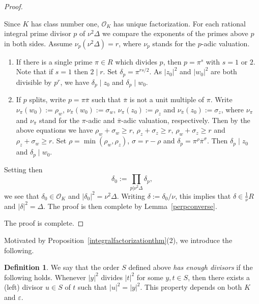 \documentclass[11pt]{amsart}
\theoremstyle{definition}
\newtheorem*{definition}{Definition}
\theoremstyle{remark}
\begin{document}
\begin{proof}
\begin{enumerate}
Since $K$ has class number one, $\mathcal{O}_K$ has unique factorization. For each rational integral prime divisor $p$ of $\nu^2\Delta$ we compare the exponents of the primes above $p$ in both sides. Assume $\nu_p(\nu^2\Delta)=r$, where $\nu_p$ stands for the $p$-adic valuation.
\begin{enumerate}
\item If there is a single prime $\pi\in R$ which divides $p$, then $p=\pi^s$ with $s=1$ or $2$. Note that if $s=1$ then $2\mid r$. Set $\delta_p=\pi^{rs/2}$. As $|z_0|^2$ and $|w_0|^2$ are both divisible by $p^r$, we have $\delta_p\mid z_0$ and $\delta_p\mid w_0$.
\item If $p$ splits, 
write $p=\pi\overline\pi$ such that $\overline{\pi}$ is not a unit multiple of $\pi$.
Write $\nu_{\pi}(w_0):=\rho_w$, $\nu_{\overline{\pi}}(w_0):=\sigma_w$, $\nu_{\pi}(z_0):=\rho_z$ and $\nu_{\overline{\pi}}(z_0):=\sigma_z$, where $\nu_{\pi}$ and $\nu_{\overline{\pi}}$ stand for the $\pi$-adic and $\overline{\pi}$-adic valuation, respectively. Then by the above equations we have $\rho_w+\sigma_w\geq r$, $\rho_z+\sigma_z\geq r$, $\rho_w+\sigma_z\geq r$ and $\rho_z+\sigma_w\geq r$. Set $\rho=\min(\rho_w,\rho_z)$, $\sigma=r-\rho$ and $\delta_p=\pi^\rho\overline\pi^\sigma$. Then $\delta_p\mid z_0$ and $\delta_p\mid w_0$.
\end{enumerate}
Setting then
\[\delta_0:=\prod_{p|\nu^2\Delta}\delta_p,\]
we see that $\delta_0\in \mathcal{O}_K$ and $|\delta_0|^2=\nu^2 \Delta$. Writing $\delta:=\delta_0/\nu$, this implies that $\delta\in\frac{1}{\nu} R$ and $|\delta|^2=\Delta$. The proof is then complete by Lemma~\ref{perpconverse}.
\end{enumerate}
The proof is complete.
\end{proof}


Motivated by Proposition~\ref{integralfactorizationthm}(2), we introduce the following.
\begin{definition}
We say that the order $S$ defined above \emph{has enough divisors} if
the following holds. Whenever $|y|^2$ divides $|t|^2$ for some $y,t\in S$, then there exists a (left) divisor $u\in S$ of $t$ such that $|u|^2=|y|^2$. This property depends on both $K$ and $\varepsilon$.
\end{definition}
\end{document}
